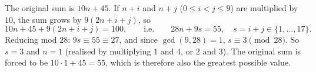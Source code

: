 The original sum is $10n+45$. If $n+i$ and $n+j$ ($0\le i<j\le9$) are multiplied by $10$, the sum grows by $9(2n+i+j)$, so
\[10n+45+9(2n+i+j)=100,\qquad\text{i.e.}\qquad28n+9s=55,\quad s=i+j\in\{1,\dots,17\}.\]
Reducing mod $28$: $9s\equiv55\equiv27$, and since $\gcd(9,28)=1$, $s\equiv3\pmod{28}$. So $s=3$ and $n=1$ (realised by multiplying $1$ and $4$, or $2$ and $3$). The original sum is forced to be $10\cdot1+45=\boxed{55}$, which is therefore also the greatest possible value.
